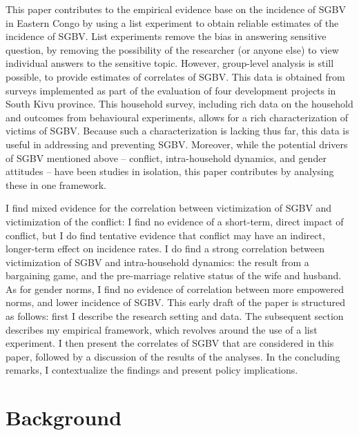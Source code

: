 \documentclass[10pt,a4paper]{scrartcl} %
\begin{document}
This paper contributes to the empirical evidence base on the incidence of SGBV in Eastern Congo by using a list experiment to obtain reliable estimates of the incidence of SGBV. List experiments remove the bias in answering sensitive question, by removing the possibility of the researcher (or anyone else) to view individual answers to the sensitive topic. However, group-level analysis is still possible, to provide estimates of correlates of SGBV. This data is obtained from surveys implemented as part of the evaluation of four development projects in South Kivu province. This household survey, including rich data on the household and outcomes from behavioural experiments, allows for a rich characterization of victims of SGBV.  Because such a characterization is lacking thus far, this data is useful in addressing and preventing SGBV. Moreover, while the potential drivers of SGBV mentioned above -- conflict, intra-household dynamics, and gender attitudes -- have been studies in isolation, this paper contributes by analysing these in one framework.

I find mixed evidence for the correlation between victimization of SGBV and victimization of the conflict: I find no evidence of a short-term, direct impact of conflict, but I do find tentative evidence that conflict may have an indirect, longer-term effect on incidence rates. I do find a strong correlation between victimization of SGBV and intra-household dynamics: the result from a bargaining game, and the pre-marriage relative status of the wife and husband. As for gender norms, I find no evidence of correlation between more empowered norms, and lower incidence of SGBV. This early draft of the paper is structured as follows: first I describe the research setting and data. The subsequent section describes my empirical framework, which revolves around the use of a list experiment. I then present the correlates of SGBV that are considered in this paper, followed by a discussion of the results of the analyses. In the concluding remarks, I contextualize the findings and present policy implications.

\section*{Background}
\end{document}
